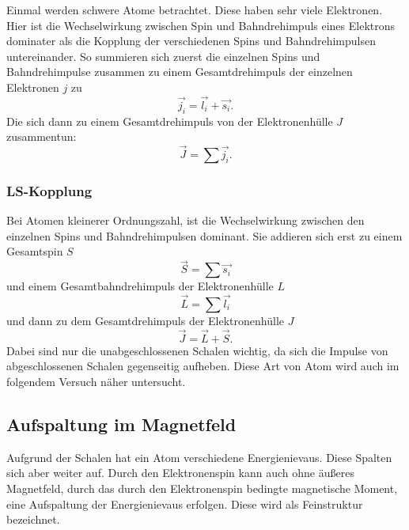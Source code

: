 Einmal werden schwere Atome betrachtet. Diese haben sehr viele Elektronen. Hier ist die Wechselwirkung 
zwischen Spin und Bahndrehimpuls eines Elektrons dominater als die Kopplung der verschiedenen Spins und 
Bahndrehimpulsen untereinander. So summieren sich zuerst die einzelnen Spins und Bahndrehimpulse zusammen 
zu einem Gesamtdrehimpuls der einzelnen Elektronen $j$ zu 
\begin{equation*}
    \vec{j_i} = \vec{l_i} + \vec{s_i}.
\end{equation*}
Die sich dann zu einem Gesamtdrehimpuls von der Elektronenhülle $J$ zusammentun:
\begin{equation*}
    \vec{J} = \sum{\vec{j_i}}.
\end{equation*}

\subsubsection{LS-Kopplung}

Bei Atomen kleinerer Ordnungszahl, ist die Wechselwirkung zwischen den einzelnen Spins und Bahndrehimpulsen 
dominant. Sie addieren sich erst zu einem Gesamtspin $S$
\begin{equation*}
    \vec{S} = \sum {\vec{s_i}}
\end{equation*}
und einem Gesamtbahndrehimpuls der Elektronenhülle $L$
\begin{equation*}
    \vec{L} = \sum {\vec{l_i}}
\end{equation*}
und dann zu dem Gesamtdrehimpuls der Elektronenhülle $J$
\begin{equation*}
    \vec{J} =  \vec{L} + \vec{S}.
\end{equation*}
Dabei sind nur die unabgeschlossenen Schalen wichtig, da sich die Impulse von abgeschlossenen Schalen 
gegenseitig aufheben.
Diese Art von Atom wird auch im folgendem Versuch näher untersucht. 


\subsection{Aufspaltung im Magnetfeld}

Aufgrund der Schalen hat ein Atom verschiedene Energienievaus.
Diese Spalten sich aber weiter auf. 
Durch den Elektronenspin kann auch ohne äußeres Magnetfeld, durch das durch den Elektronenspin 
bedingte magnetische Moment, eine Aufspaltung der Energienievaus erfolgen. Diese wird als Feinstruktur 
bezeichnet. 

